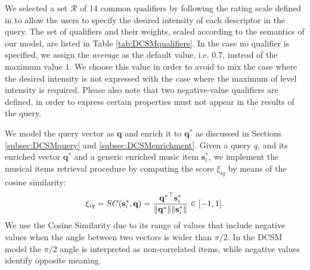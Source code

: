 We selected a set $\mathcal{R}$ of 14 common qualifiers by following the rating scale defined in \cite{Rohrmann2003} to allow the users to specify the desired intensity of each descriptor in the query. The set of qualifiers and their weights, scaled according to the semantics of our model, are listed in Table \ref{tab:DCSMqualifiers}. In the case no qualifier is specified, we assign the \textit{average} as the default value, i.e. $0.7$, instead of the maximum value $1$. We choose this value in order to avoid to mix the case where the desired intensity is not expressed with the case where the maximum of level intensity is required. Please also note that two negative-value qualifiers are defined, in order to express certain properties must not appear in the results of the query.

We model the query vector as $\mathbf{q}$ and enrich it to $\mathbf{q}^*$ as discussed in Sections \ref{subsec:DCSMquery} and \ref{subsec:DCSMenrichment}. Given a query $q$, and its enriched vector $\mathbf{q}^*$ and a generic enriched music item $\mathbf{s}_i^*$, we implement the musical items retrieval procedure by computing the score $\xi_{i q}$ by means of the cosine similarity:
\begin{equation}
\xi_{i q} = SC(\mathbf{s}_i^*,\mathbf{q}) 
		 = \frac{{\mathbf{q}^*}^\top \mathbf{s}_i^*}{\|{\mathbf{q}^*} \| \|{\mathbf{s}_i^*} \|} \in [-1,1].
\end{equation}
We use the Cosine Similarity due to its range of values that include negative values when the angle between two vectors is wider than $\pi/2 $. In the DCSM model the $\pi/2 $ angle is interpreted as non-correlated items, while negative values identify opposite meaning.

